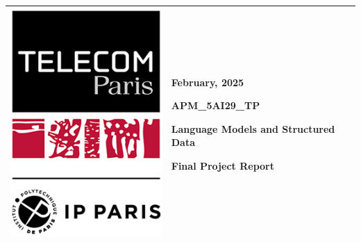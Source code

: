 \documentclass[12pt,a4paper]{article}
\begin{document}
\begin{center}
    \begin{tabular}{|p{}|p{}|}
        \hline
        {
            \vspace{0cm} %
            \centerline{\includegraphics[width=\linewidth]{./images/tp-ipp}}
        }
        & {
            \vspace{0cm} %
            \centering
            \large
            {\hfill February, 2025}

            \vspace*{.5cm}
            \textbf{APM\_5AI29\_TP}

            \vspace*{.5cm}
            \setstretch{1.5}
            {\Large\textbf{Language Models and Structured Data}}

            \vspace*{.5cm}
            Final Project Report

            \vspace*{1cm}
        } \\
        \hline
    \end{tabular}
\end{center}
\end{document}

